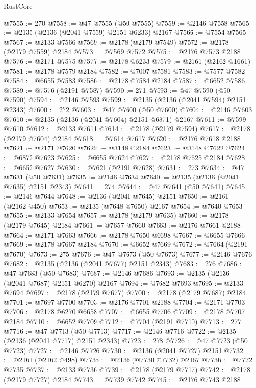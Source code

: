\begin{lexlean}{RustCore}
\begin{coremodule}
@7555 := 270
@7558 := @47 @7555 (@50 @7555)
@7559 := @2146 @7558
@7565 := @2135 (@2136 (@2041 @7559) @2151 @6233) @2167
@7566 := @7554 @7565
@7567 := @2133 @7566
@7569 := @2178 (@2179 @7549)
@7572 := @2178 (@2179 @7559) @2184
@7573 := @7569 @7572
@7575 := @2176 @7573 @2188
@7576 := @2171 @7575
@7577 := @2178 @6233
@7579 := @2161 (@2162 @1661)
@7581 := @2178 @7579 @2184
@7582 := @7007 @7581
@7583 := @7577 @7582
@7584 := @6655 @7583
@7586 := @2178 @7584 @2184
@7587 := @6652 @7586
@7589 := @7576 (@2191 @7587)
@7590 := 271
@7593 := @47 @7590 (@50 @7590)
@7594 := @2146 @7593
@7599 := @2135 (@2136 (@2041 @7594) @2151 @2343)
@7600 := 272
@7603 := @47 @7600 (@50 @7600)
@7604 := @2146 @7603
@7610 := @2135 (@2136 (@2041 @7604) @2151 @6871) @2167
@7611 := @7599 @7610
@7612 := @2133 @7611
@7614 := @2178 (@2179 @7594)
@7617 := @2178 (@2179 @7604) @2184
@7618 := @7614 @7617
@7620 := @2176 @7618 @2188
@7621 := @2171 @7620
@7622 := @3148 @2184
@7623 := @3148 @7622
@7624 := @6872 @7623
@7625 := @6655 @7624
@7627 := @2178 @7625 @2184
@7628 := @6652 @7627
@7630 := @7621 (@2191 @7628)
@7631 := 273
@7634 := @47 @7631 (@50 @7631)
@7635 := @2146 @7634
@7640 := @2135 (@2136 (@2041 @7635) @2151 @2343)
@7641 := 274
@7644 := @47 @7641 (@50 @7641)
@7645 := @2146 @7644
@7648 := @2136 (@2041 @7645) @2151
@7650 := @2161 (@2162 @450)
@7653 := @2135 (@7648 @7650) @2167
@7654 := @7640 @7653
@7655 := @2133 @7654
@7657 := @2178 (@2179 @7635)
@7660 := @2178 (@2179 @7645) @2184
@7661 := @7657 @7660
@7663 := @2176 @7661 @2188
@7664 := @2171 @7663
@7666 := @2178 @7650 @6698
@7667 := @6655 @7666
@7669 := @2178 @7667 @2184
@7670 := @6652 @7669
@7672 := @7664 (@2191 @7670)
@7673 := 275
@7676 := @47 @7673 (@50 @7673)
@7677 := @2146 @7676
@7682 := @2135 (@2136 (@2041 @7677) @2151 @2343)
@7683 := 276
@7686 := @47 @7683 (@50 @7683)
@7687 := @2146 @7686
@7693 := @2135 (@2136 (@2041 @7687) @2151 @6270) @2167
@7694 := @7682 @7693
@7695 := @2133 @7694
@7697 := @2178 (@2179 @7677)
@7700 := @2178 (@2179 @7687) @2184
@7701 := @7697 @7700
@7703 := @2176 @7701 @2188
@7704 := @2171 @7703
@7706 := @2178 @6270 @6658
@7707 := @6655 @7706
@7709 := @2178 @7707 @2184
@7710 := @6652 @7709
@7712 := @7704 (@2191 @7710)
@7713 := 277
@7716 := @47 @7713 (@50 @7713)
@7717 := @2146 @7716
@7722 := @2135 (@2136 (@2041 @7717) @2151 @2343)
@7723 := 278
@7726 := @47 @7723 (@50 @7723)
@7727 := @2146 @7726
@7730 := @2136 (@2041 @7727) @2151
@7732 := @2161 (@2162 @498)
@7735 := @2135 (@7730 @7732) @2167
@7736 := @7722 @7735
@7737 := @2133 @7736
@7739 := @2178 (@2179 @7717)
@7742 := @2178 (@2179 @7727) @2184
@7743 := @7739 @7742
@7745 := @2176 @7743 @2188

\end{coremodule}
\end{lexlean}
